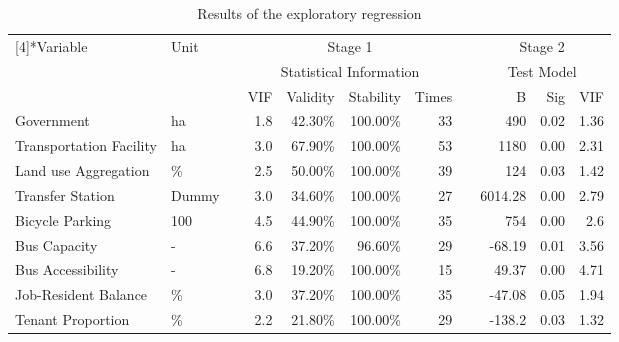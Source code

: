 \begin{sidewaystable}[htbp]
	\centering
	\caption{Results of the exploratory regression}
	\label{tab:chp3:ExploratoryRegression}%
	\small
	\renewcommand{\arraystretch}{1.25} %
	\begin{tabular}{llrrrrrcrrr}
		\Xhline{1.5pt}
		
		\multirow{3}[4]{*}{Variable} & \multirow{3}[4]{*}{Unit} & & \multicolumn{4}{c}{Stage 1} & & \multicolumn{3}{c}{Stage 2} \\
		
		& & & \multicolumn{4}{c}{Statistical Information} & & \multicolumn{3}{c}{Test Model} \\
		
		\cmidrule{4-7} \cmidrule{9-11}
		
		& & & VIF & Validity & Stability & Times & & B & Sig & VIF \\
		
		\cmidrule{1-2}\cmidrule{4-7}\cmidrule{9-11}
		
		Government & ha & & 1.8 & 42.30\% & 100.00\% & 33 & & 490 & 0.02  & 1.36 \\
		Transportation Facility & ha & & 3.0 & 67.90\% & 100.00\% & 53 & & 1180 & 0.00 & 2.31 \\
		
		Land use Aggregation & \% & & 2.5 & 50.00\% & 100.00\% & 39 & & 124 & 0.03 & 1.42 \\
		
		Transfer Station & Dummy & & 3.0 & 34.60\% & 100.00\% & 27 & & 6014.28 & 0.00 & 2.79 \\
		
		Bicycle Parking & 100 & & 4.5 & 44.90\% & 100.00\% & 35 & & 754 & 0.00 & 2.6 \\
		
		Bus Capacity & - & & 6.6 & 37.20\% & 96.60\% & 29 & & -68.19 & 0.01 & 3.56 \\
		
		Bus Accessibility & - & & 6.8 & 19.20\% & 100.00\% & 15 & & 49.37 & 0.00 & 4.71 \\
		
		Job-Resident Balance & \% & & 3.0 & 37.20\% & 100.00\% & 35 & & -47.08 & 0.05  & 1.94 \\
		
		Tenant Proportion & \% & & 2.2 & 21.80\% & 100.00\% & 29 & & -138.2 & 0.03  & 1.32 \\
		

\end{tabular}
\end{sidewaystable}

